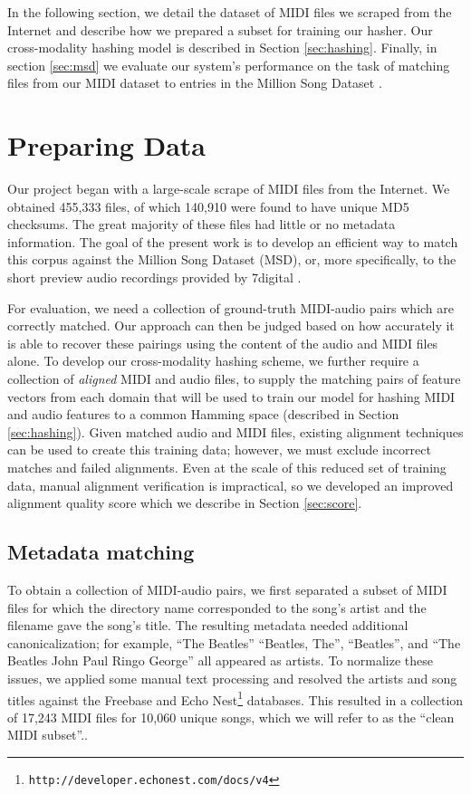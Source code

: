 \documentclass{article}
\begin{document}
In the following section, we detail the dataset of MIDI files we scraped from the Internet and describe how we prepared a subset for training our hasher.
Our cross-modality hashing model is described in Section \ref{sec:hashing}.
Finally, in section \ref{sec:msd} we evaluate our system's performance on the task of matching files from our MIDI dataset to entries in the Million Song Dataset \cite{bertin2011million}.

\section{Preparing Data}
\label{sec:dataset}

Our project began with a large-scale scrape of MIDI files from the Internet.
We obtained 455,333 files, of which 140,910 were found to have unique MD5 checksums.
The great majority of these files had little or no metadata information.
The goal of the present work is to develop an efficient way to match this corpus against the Million Song Dataset (MSD), or, more specifically, to the short preview audio recordings provided by 7digital \cite{schindler2012facilitating}.

For evaluation, we need a collection of ground-truth MIDI-audio pairs which are correctly matched.
Our approach can then be judged based on how accurately it is able to recover these pairings using the content of the audio and MIDI files alone.
To develop our cross-modality hashing scheme, we further require a collection of {\em aligned} MIDI and audio files, to supply the matching pairs of feature vectors from each domain that will be used to train our model for hashing MIDI and audio features to a common Hamming space (described in Section \ref{sec:hashing}).
Given matched audio and MIDI files, existing alignment techniques can be used to create this training data; however, we must exclude incorrect matches and failed alignments.
Even at the scale of this reduced set of training data, manual alignment verification is impractical, so we developed an improved alignment quality score which we describe in Section \ref{sec:score}.

\subsection{Metadata matching}

To obtain a collection of MIDI-audio pairs, we first separated a subset of MIDI files for which the directory name corresponded to the song's artist and the filename gave the song's title.
The resulting metadata needed additional canonicalization; for example, ``The Beatles'' ``Beatles, The'', ``Beatles'', and ``The Beatles John Paul Ringo George'' all appeared as artists.
To normalize these issues, we applied some manual text processing and resolved the artists and song titles against the Freebase \cite{bollacker2008freebase} and Echo Nest\footnote{\texttt{http://developer.echonest.com/docs/v4}} databases.
This resulted in a collection of 17,243 MIDI files for 10,060 unique songs, which we will refer to as the ``clean MIDI subset''..
\end{document}
